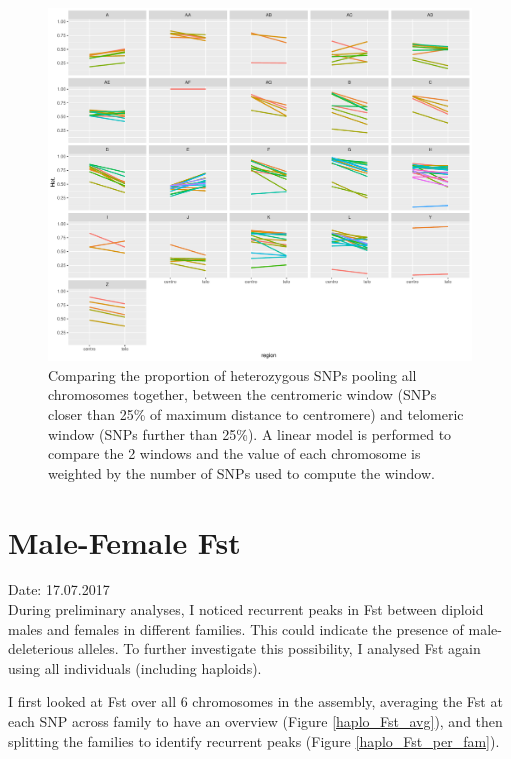 \documentclass[10pt,a4paper]{report}
\begin{document}
\begin{figure}[h]
	\begin{center}
		\includegraphics[width=1\textwidth]{Num_CSD_loci/lm_centro25_telo_fam.pdf}
		\caption{Comparing the proportion of heterozygous SNPs pooling all chromosomes together, between the centromeric window (SNPs closer than 25\% of maximum distance to centromere) and telomeric window (SNPs further than 25\%). A linear model is performed to compare the 2 windows and the value of each chromosome is weighted by the number of SNPs used to compute the window.}
		\label{cen_tel_lm}
	\end{center}
\end{figure}

\FloatBarrier

\chapter{Male-Female Fst}

Date: 17.07.2017\\
During preliminary analyses, I noticed recurrent peaks in Fst between diploid males and females in different families. This could indicate the presence of male-deleterious alleles. To further investigate this possibility, I analysed Fst again using all individuals (including haploids).

I first looked at Fst over all 6 chromosomes in the assembly, averaging the Fst at each SNP across family to have an overview (Figure \ref{haplo_Fst_avg}), and then splitting the families to identify recurrent peaks (Figure \ref{haplo_Fst_per_fam}).
\end{document}

